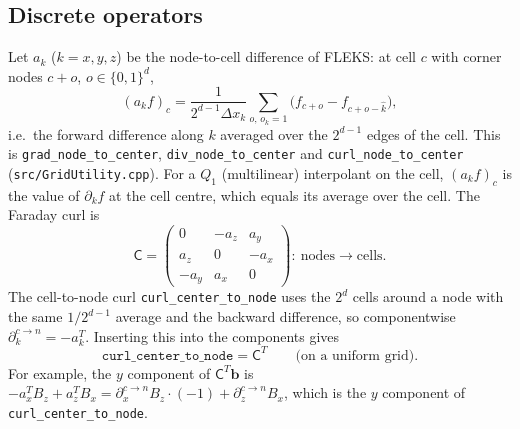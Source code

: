 \documentclass[a4paper,11pt]{article}
\newcommand{\code}[1]{\texttt{#1}}
\newcommand{\BB}{\mathbf{b}}
\newcommand{\Cm}{\mathsf{C}}
\begin{document}
\subsection{Discrete operators}
Let $a_k$ ($k=x,y,z$) be the node-to-cell difference of FLEKS: at cell $c$ with
corner nodes $c+o$, $o\in\{0,1\}^d$,
\begin{equation}
(a_k f)_c=\frac{1}{2^{d-1}\Delta x_k}\sum_{o,\,o_k=1}\bigl(f_{c+o}-f_{c+o-\hat k}\bigr),
\label{eq:ak}
\end{equation}
i.e.\ the forward difference along $k$ averaged over the $2^{d-1}$ edges of the
cell. This is \code{grad\_node\_to\_center}, \code{div\_node\_to\_center} and
\code{curl\_node\_to\_center} (\code{src/GridUtility.cpp}). For a $Q_1$
(multilinear) interpolant on the cell, $(a_kf)_c$ is the value of $\partial_kf$ at
the cell centre, which equals its average over the cell. The Faraday curl is
\begin{equation}
\Cm=\begin{pmatrix}0&-a_z&a_y\\ a_z&0&-a_x\\ -a_y&a_x&0\end{pmatrix}:
\ \text{nodes}\to\text{cells}.
\end{equation}
The cell-to-node curl \code{curl\_center\_to\_node} uses the $2^d$ cells around
a node with the same $1/2^{d-1}$ average and the backward difference, so
componentwise $\partial^{c\to n}_k=-a_k^{T}$. Inserting this into the components gives
\begin{equation}
\code{curl\_center\_to\_node}=\Cm^{T}\qquad\text{(on a uniform grid)}.
\label{eq:curlT}
\end{equation}
For example, the $y$ component of $\Cm^{T}\BB$ is $-a_x^TB_z+a_z^TB_x
=\partial^{c\to n}_xB_z\cdot(-1)+\partial^{c\to n}_zB_x$, which is the $y$ component
of \code{curl\_center\_to\_node}.
\end{document}
